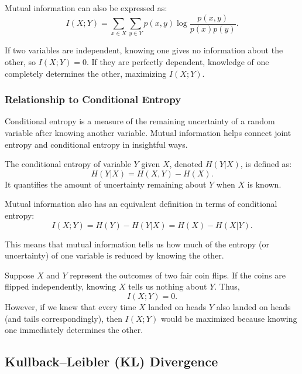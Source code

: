 \documentclass[12pt,a4paper]{article}
\newenvironment{defbox}[1][]{%
  \begin{tcolorbox}[enhanced, breakable, colback=defcolor, colframe=green!50!black, title=#1, fonttitle=\bfseries, arc=3pt, boxrule=0.5pt]
}{\end{tcolorbox}}
\newenvironment{exbox}[1][]{%
  \begin{tcolorbox}[enhanced, breakable, colback=excolor, colframe=brown!50!black, title=#1, fonttitle=\bfseries, arc=3pt, boxrule=0.5pt]
}{\end{tcolorbox}}
\newenvironment{rembox}[1][]{%
  \begin{tcolorbox}[enhanced, breakable, colback=gray!5, colframe=gray!50, title=#1, fonttitle=\bfseries, arc=3pt, boxrule=0.5pt]
}{\end{tcolorbox}}
\begin{document}
Mutual information can also be expressed as:
\[
I(X;Y) = \sum_{x \in X} \sum_{y \in Y} p(x,y) \log \frac{p(x,y)}{p(x)p(y)}.
\]

\begin{exbox}[Intuition]
If two variables are independent, knowing one gives no information about the other, so \( I(X;Y) = 0 \). If they are perfectly dependent, knowledge of one completely determines the other, maximizing \( I(X;Y) \).
\end{exbox}

\subsubsection{Relationship to Conditional Entropy}

Conditional entropy is a measure of the remaining uncertainty of a random variable after knowing another variable. Mutual information helps connect joint entropy and conditional entropy in insightful ways.

\begin{defbox}[Conditional Entropy]
The conditional entropy of variable \( Y \) given \( X \), denoted \( H(Y|X) \), is defined as:
\[
H(Y|X) = H(X,Y) - H(X).
\]
It quantifies the amount of uncertainty remaining about \( Y \) when \( X \) is known.
\end{defbox}

Mutual information also has an equivalent definition in terms of conditional entropy:
\[
I(X;Y) = H(Y) - H(Y|X) = H(X) - H(X|Y).
\]

\begin{rembox}[Interpretation]
This means that mutual information tells us how much of the entropy (or uncertainty) of one variable is reduced by knowing the other.
\end{rembox}

\begin{exbox}[Example: Coin Toss]
Suppose \( X \) and \( Y \) represent the outcomes of two fair coin flips. If the coins are flipped independently, knowing \( X \) tells us nothing about \( Y \). Thus, \[
I(X;Y) = 0.
\]
However, if we knew that every time \( X \) landed on heads \( Y \) also landed on heads (and tails correspondingly), then \( I(X;Y) \) would be maximized because knowing one immediately determines the other.
\end{exbox}

\subsection{Kullback–Leibler (KL) Divergence}
\end{document}
